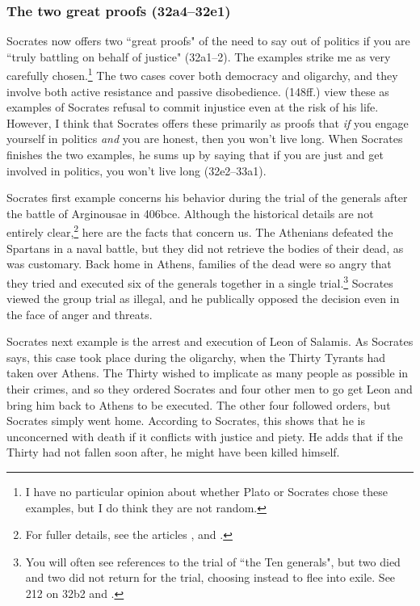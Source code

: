 \documentclass[11pt]{article}
\begin{document}
\subsubsection{The two great proofs (32a4--32e1)}

Socrates now offers two ``great proofs" of the need to say out of politics
if you are ``truly battling on behalf of justice" (32a1--2).  The examples
strike me as very carefully chosen.\footnote{I have no particular opinion
    about whether Plato or Socrates chose these examples, but I do think
they are not random.}  The two cases cover both democracy and oligarchy,
and they involve both active resistance and passive disobedience.
\citet{brickhouse2004} (148ff.) view these as examples of Socrates refusal
to commit injustice even at the risk of his life.  However, I think that
Socrates offers these primarily as proofs that \emph{if} you engage
yourself in politics \emph{and} you are honest, then you won't live long.
When Socrates finishes the two examples, he sums up by saying that if you
are just and get involved in politics, you won't live long (32e2--33a1).

Socrates first example concerns his behavior during the trial of the
generals after the battle of Arginousae in 406bce.  Although the historical
details are not entirely clear,\footnote{For fuller details, see the
articles \citet{andrewes1974}, \citet{lang1990} and \citet{lang1992}.} here
are the facts that concern us.  The Athenians defeated the Spartans in
a naval battle, but they did not retrieve the bodies of their dead, as was
customary.  Back home in Athens, families of the dead were so angry that
they tried and executed six of the generals together in a single
trial.\footnote{You will often see references to the trial of ``the Ten
generals", but two died and two did not return for the trial, choosing
instead to flee into exile.  See \citet{burnet1924} 212 on 32b2 and
\citet{lang1992}.}  Socrates viewed the group trial as illegal, and he
publically opposed the decision even in the face of anger and threats.

Socrates next example is the arrest and execution of Leon of Salamis.  As
Socrates says, this case took place during the oligarchy, when the Thirty
Tyrants had taken over Athens.  The Thirty wished to implicate as many
people as possible in their crimes, and so they ordered Socrates and four
other men to go get Leon and bring him back to Athens to be executed.  The
other four followed orders, but Socrates simply went home.  According to
Socrates, this shows that he is unconcerned with death if it conflicts with
justice and piety.  He adds that if the Thirty had not fallen soon after,
he might have been killed himself.
\end{document}
